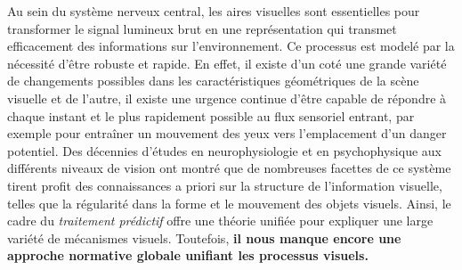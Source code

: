 
Au sein du système nerveux central, les aires visuelles sont
essentielles pour transformer le signal lumineux brut en une
représentation qui transmet efficacement des informations sur
l'environnement. Ce processus est modelé par la nécessité d'être robuste
et rapide. En effet, il existe d'un coté une grande variété de
changements possibles dans les caractéristiques géométriques de la
scène visuelle et de l'autre, il existe une urgence continue d'être capable de répondre à chaque instant et le plus rapidement
possible au flux sensoriel entrant, par exemple pour entraîner un
mouvement des yeux vers l'emplacement d'un danger potentiel. Des
décennies d'études en neurophysiologie et en psychophysique aux
différents niveaux de vision ont montré que de nombreuses facettes de ce système tirent profit des
connaissances a priori sur la structure de l'information visuelle,
telles que la régularité dans la forme et le mouvement des objets
visuels. Ainsi, le cadre du \emph{traitement prédictif} offre une théorie
unifiée pour expliquer une large variété de mécanismes visuels. Toutefois, \textbf{il
nous manque encore une approche normative globale unifiant les
processus visuels.}

